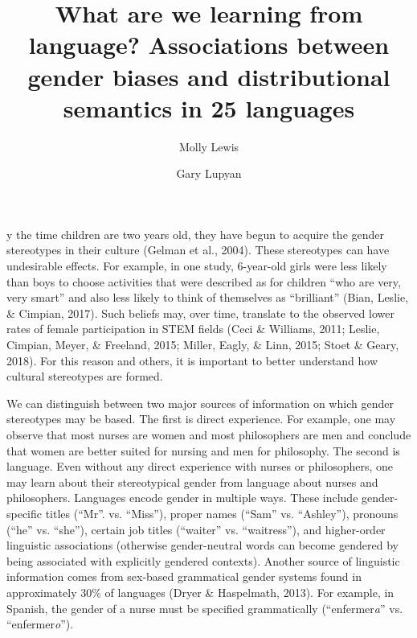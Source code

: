 \documentclass[9pt,twocolumn,twoside,lineno]{pnas-new}
\title{What are we learning from language? Associations between gender biases
and distributional semantics in 25 languages}
\author[a,b,1]{Molly Lewis}
\author[b,1,2]{Gary Lupyan}
\affil[a]{University of Chicago}
\affil[b]{University of Wisconsin-Madison}
\begin{document}
\maketitle
\thispagestyle{firststyle}

y the time children are two years old, they have begun to acquire the
gender stereotypes in their culture (Gelman et al., 2004). These
stereotypes can have undesirable effects. For example, in one study,
6-year-old girls were less likely than boys to choose activities that
were described as for children \enquote{who are very, very smart} and
also less likely to think of themselves as \enquote{brilliant} (Bian,
Leslie, \& Cimpian, 2017). Such beliefs may, over time, translate to the
observed lower rates of female participation in STEM fields (Ceci \&
Williams, 2011; Leslie, Cimpian, Meyer, \& Freeland, 2015; Miller,
Eagly, \& Linn, 2015; Stoet \& Geary, 2018). For this reason and others,
it is important to better understand how cultural stereotypes are
formed.

We can distinguish between two major sources of information on which
gender stereotypes may be based. The first is direct experience. For
example, one may observe that most nurses are women and most
philosophers are men and conclude that women are better suited for
nursing and men for philosophy. The second is language. Even without any
direct experience with nurses or philosophers, one may learn about their
stereotypical gender from language about nurses and philosophers.
Languages encode gender in multiple ways. These include gender-specific
titles (\enquote{Mr}. vs. \enquote{Miss}), proper names (\enquote{Sam}
vs. \enquote{Ashley}), pronouns (\enquote{he} vs. \enquote{she}),
certain job titles (\enquote{waiter} vs. \enquote{waitress}), and
higher-order linguistic associations (otherwise gender-neutral words can
become gendered by being associated with explicitly gendered contexts).
Another source of linguistic information comes from sex-based
grammatical gender systems found in approximately 30\% of languages
(Dryer \& Haspelmath, 2013). For example, in Spanish, the gender of a
nurse must be specified grammatically (\enquote{enfermer\emph{a}} vs.
\enquote{enfermer\emph{o}}).
\end{document}
